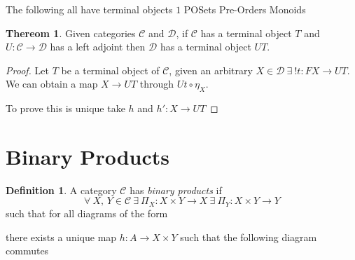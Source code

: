\documentclass{article}
\theoremstyle{definition}
\newtheorem{definition}{Definition}[section]
\newtheorem{theorem}{Thereom}[section]
\newcommand{\C}{\mathcal{C}}
\newcommand{\D}{\mathcal{D}}
\begin{document}
The following all have terminal objects $1$
POSets
Pre-Orders
Monoids

\begin{theorem}
    Given categories $\C$ and $\D$,
    if $\C$ has a terminal object $T$
    and $U : \C \rightarrow \D$ has a left adjoint
    then $\D$ has a terminal object $UT$.
\end{theorem}

\begin{proof}
    Let $T$ be a terminal object of $\C$, given an arbitrary
    $X \in \D\ \exists\ !t : FX \rightarrow UT$.
    We can obtain a map $X \rightarrow UT$ through $Ut \circ \eta_X$.

    To prove this is unique take $h$ and $h\prime : X \rightarrow UT$
\end{proof}


\section{Binary Products}
\begin{definition}
    A category $\C$ has \textit{binary products} if
    $$
    \forall\ X,\,Y \in \C
    \ \exists\ \Pi_X : X \times Y \rightarrow X
    \ \exists\ \Pi_Y : X \times Y \rightarrow Y
    $$
    such that for all diagrams of the form
    \begin{center}
    \end{center}
    there exists a unique map $h : A \rightarrow X \times Y$
    such that the following diagram commutes
    \begin{center}
    \end{center}
\end{definition}
\end{document}

